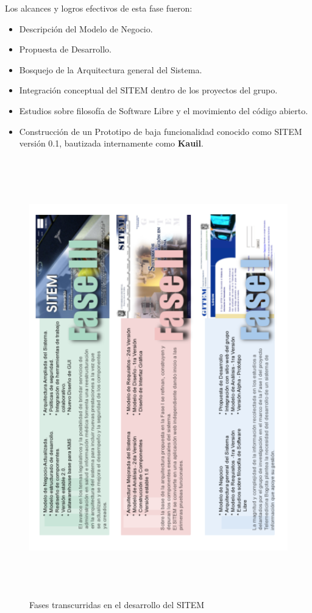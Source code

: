 Los alcances y logros efectivos de esta fase fueron:

\begin{itemize}
\item Descripción del Modelo de Negocio.
\item Propuesta de Desarrollo.
\item Bosquejo de la Arquitectura general del Sistema.
\item Integración conceptual del SITEM dentro de los proyectos del grupo.
\item Estudios sobre filosofía de Software Libre y el movimiento del código abierto.
\item Construcción de un Prototipo de baja funcionalidad conocido como SITEM versión 0.1, bautizada internamente como \textbf{Kauil}.
\end{itemize}


\begin{figure}
 \centering
 \includegraphics[width=142mm, height=190mm]{fase_sitem.png}
 \caption{Fases transcurridas en el desarrollo del SITEM}
 \label{fase_sitem}
\end{figure}

